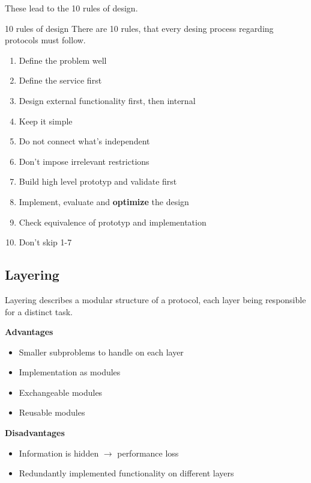 \documentclass[english]{panikzettel}
\begin{document}
	These lead to the 10 rules of design.

	\begin{defi}{10 rules of design}
		There are 10 rules, that every desing process regarding protocols must follow.
		\tcblower
		\begin{enumerate}
			\item Define the problem well
			\item Define the service first
			\item Design external functionality first, then internal
			\item Keep it simple
			\item Do not connect what's independent
			\item Don't impose irrelevant restrictions
			\item Build high level prototyp and validate first
			\item Implement, evaluate and \textbf{optimize} the design
			\item Check equivalence of prototyp and implementation
			\item Don't skip 1-7
		\end{enumerate}
	\end{defi}

	\subsection{Layering}
	\label{ss-layering}

	Layering describes a modular structure of a protocol, each layer being responsible for a distinct task.

	\begin{halfboxl}
		\textbf{Advantages}
		\begin{itemize}
			\item Smaller subproblems to handle on each layer
			\item Implementation as modules
			\item Exchangeable modules
			\item Reusable modules
		\end{itemize}
	\end{halfboxl}%
 	\begin{halfboxr}
		\vspace{-\baselineskip}
 		\textbf{Disadvantages}
		\begin{itemize}
			\item Information is hidden \( \rightarrow \) performance loss
			\item Redundantly implemented functionality on different layers
		\end{itemize}
 	\end{halfboxr}
\end{document}
